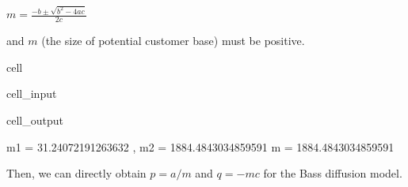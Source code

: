 \documentclass[letterpaper,10pt,english]{jupyterBook}
\begin{document}
\sphinxAtStartPar
\(m = \frac{-b \pm \sqrt{b^2-4ac}}{2c}\)

\sphinxAtStartPar
and \(m\) (the size of potential customer base) must be positive.

\begin{sphinxuseclass}{cell}\begin{sphinxVerbatimInput}

\begin{sphinxuseclass}{cell_input}
\begin{sphinxVerbatim}[commandchars=\\\{\}]
  
  
  
     
\end{sphinxVerbatim}

\end{sphinxuseclass}\end{sphinxVerbatimInput}
\begin{sphinxVerbatimOutput}

\begin{sphinxuseclass}{cell_output}
\begin{sphinxVerbatim}[commandchars=\\\{\}]
m1 =  \PYGZhy{}31.24072191263632 , m2 =  1884.4843034859591 m =  1884.4843034859591
\end{sphinxVerbatim}

\end{sphinxuseclass}\end{sphinxVerbatimOutput}

\end{sphinxuseclass}
\sphinxAtStartPar
Then, we can directly obtain \(p = a/m\) and \(q = -mc\) for the Bass diffusion model.
\end{document}
